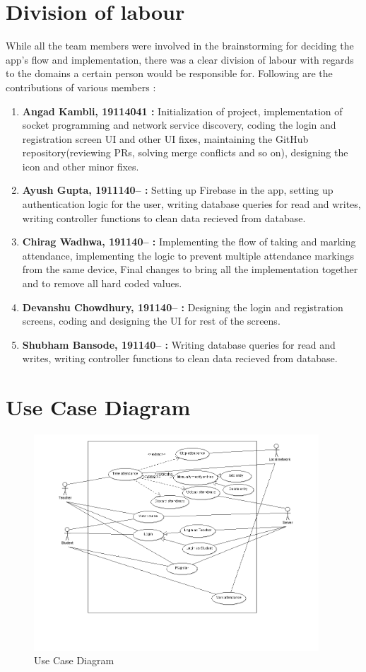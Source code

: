 \documentclass{article}
\begin{document}
\section{Division of labour}
While all the team members were involved in the brainstorming for deciding the app's flow and implementation, there was a clear division of labour with regards to the domains a certain person would be responsible for. Following are the contributions of various members :
\begin{enumerate}
    \item \textbf{Angad Kambli, 19114041 :} Initialization of project, implementation of socket programming and network service discovery, coding the login and registration screen UI and other UI fixes, maintaining the GitHub repository(reviewing PRs, solving merge conflicts and so on), designing the icon and other minor fixes.
    \item \textbf{Ayush Gupta, 1911140-- : } Setting up Firebase in the app, setting up authentication logic for the user, writing database queries for read and writes, writing controller functions to clean data recieved from database.
    \item \textbf{Chirag Wadhwa, 191140-- : } Implementing the flow of taking and marking attendance, implementing the logic to prevent multiple attendance markings from the same device, Final changes to bring all the implementation together and to remove all hard coded values.
    \item \textbf{Devanshu Chowdhury, 191140-- : } Designing the login and registration screens, coding and designing the UI for rest of the screens.
    \item \textbf{Shubham Bansode, 191140-- : }  Writing database queries for read and writes, writing controller functions to clean data recieved from database.
    
\end{enumerate}

\section{Use Case Diagram}
\begin{figure}[H]
    \centering
    \includegraphics[width=0.95\textwidth]{UseCaseDiagram.png}
    \caption{Use Case Diagram}
    \label{fig:UseCase}
\end{figure}
\end{document}

